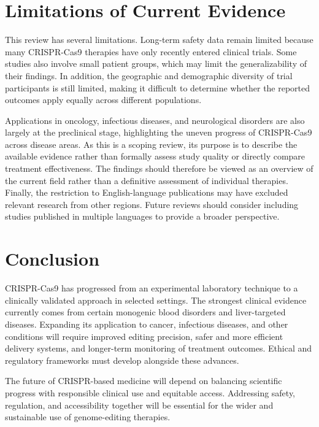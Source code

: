 \documentclass[11pt,a4paper]{article}
\begin{document}
\section{Limitations of Current Evidence}\label{limitations-of-current-evidence}

This review has several limitations. Long-term safety data remain limited because many CRISPR-Cas9 therapies have only recently entered clinical trials. Some studies also involve small patient groups, which may limit the generalizability of their findings. In addition, the geographic and demographic diversity of trial participants is still limited, making it difficult to determine whether the reported outcomes apply equally across different populations.

Applications in oncology, infectious diseases, and neurological disorders are also largely at the preclinical stage, highlighting the uneven progress of CRISPR-Cas9 across disease areas. As this is a scoping review, its purpose is to describe the available evidence rather than formally assess study quality or directly compare treatment effectiveness. The findings should therefore be viewed as an overview of the current field rather than a definitive assessment of individual therapies. Finally, the restriction to English-language publications may have excluded relevant research from other regions. Future reviews should consider including studies published in multiple languages to provide a broader perspective.

\section{Conclusion}\label{conclusion}

CRISPR-Cas9 has progressed from an experimental laboratory technique to a clinically validated approach in selected settings. The strongest clinical evidence currently comes from certain monogenic blood disorders and liver-targeted diseases. Expanding its application to cancer, infectious diseases, and other conditions will require improved editing precision, safer and more efficient delivery systems, and longer-term monitoring of treatment outcomes. Ethical and regulatory frameworks must develop alongside these advances.

The future of CRISPR-based medicine will depend on balancing scientific progress with responsible clinical use and equitable access. Addressing safety, regulation, and accessibility together will be essential for the wider and sustainable use of genome-editing therapies.
\end{document}
